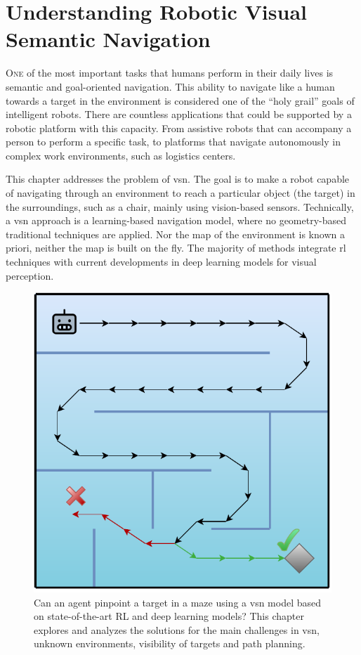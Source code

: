 \chapter{Understanding Robotic Visual Semantic Navigation}\label{ch:understanding-robotic-visual-semantic-navigation}

\lettrine{\textcolor{accent_color}{O}}{ne} of the most important tasks that humans perform in their daily lives is semantic and goal-oriented navigation.
This ability to navigate like a human towards a target in the environment is considered one of the ``holy grail'' goals of intelligent robots.
There are countless applications that could be supported by a robotic platform with this capacity.
From assistive robots that can accompany a person to perform a specific task, to platforms that navigate autonomously in complex work environments, such as logistics centers.

This chapter addresses the problem of \acrlong{vsn}.
The goal is to make a robot capable of navigating through an environment to reach a particular object (the target) in the surroundings, such as a chair, mainly using vision-based sensors.
Technically, a \acrshort{vsn} approach is a learning-based navigation model, where no geometry-based traditional techniques are applied.
Nor the map of the environment is known a priori, neither the map is built on the fly.
The majority of methods integrate \acrshort{rl} techniques with current developments in deep learning models for visual perception.

\begin{figure}
    \centering
    \includegraphics[width=0.6\linewidth]{figures/understanding_vsn/graphical_abstract}
    \caption{Can an agent pinpoint a target in a maze using a \acrshort{vsn} model based on state-of-the-art RL and deep learning models? This chapter explores and analyzes the solutions for the main challenges in \acrshort{vsn}, \ie unknown environments, visibility of targets and path planning.}
    \label{fig:graphical_abstract}
\end{figure}

